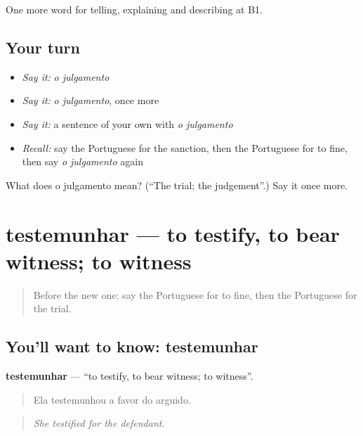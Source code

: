 \begin{grammarlens}[title={What you've built}]
One more word for telling, explaining and describing at B1.
\end{grammarlens}

\subsection*{Your turn}
\begin{itemize}
\raggedright
  \item \emph{Say it:} \emph{o julgamento}
  \item \emph{Say it:} \emph{o julgamento}, once more
  \item \emph{Say it:} a sentence of your own with \emph{o julgamento}
  \item \emph{Recall:} say the Portuguese for the sanction, then the Portuguese for to fine, then say \emph{o julgamento} again
\end{itemize}

\begin{tcolorbox}[breakable,colback=teal!4,colframe=teal!35!black,title={Before you move on}]
What does o julgamento mean? (\textquotedblleft{}The trial; the judgement\textquotedblright{}.) Say it once more.
\end{tcolorbox}
\section[testemunhar]{testemunhar — to testify, to bear witness; to witness}

\label{lesson:PT-C390-testemunhar}



\begin{quote}
Before the new one: say the Portuguese for to fine, then the Portuguese for the trial.
\end{quote}

\subsection*{You'll want to know: testemunhar}
\textbf{testemunhar} — \textquotedblleft{}to testify, to bear witness; to witness\textquotedblright{}.

\begin{quote}
Ela testemunhou a favor do arguido.
\end{quote}

\begin{quote}
\emph{She testified for the defendant.}
\end{quote}

